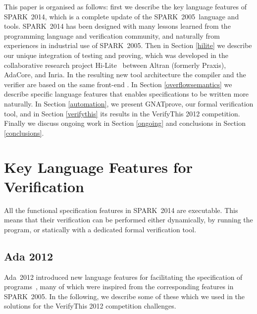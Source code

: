 \documentclass[sttt,final]{svjour}
\newcommand{\hilite}{Hi-Lite}
\newcommand{\oldspark}{SPARK~2005\xspace}
\newcommand{\newspark}{SPARK~2014\xspace}
\newcommand{\adatwtw}{Ada~2012\xspace}
\begin{document}
This paper is organised as follows: first we describe the key language
features of \newspark, which is a complete update of the \oldspark\
language and tools. \newspark has been designed with many lessons
learn\-ed from the programming language and verification community, and
naturally from experiences in industrial use of \oldspark. Then in
Section \ref{hilite} we describe our unique integration of testing and
proving, which was developed in the collaborative research project
\hilite\ \cite{hiliteERTS2012} between Altran (formerly Praxis),
AdaCore, and Inria. In the resulting new tool architecture the
compiler and the verifier are based on the same front-end
\cite{ksd2012}. In Section \ref{overflowsemantics} we describe
specific language features that enables specifications to be written
more naturally. In Section \ref{automation}, we present GNATprove, our
formal verification tool, and in Section \ref{verifythis} its results in
the VerifyThis 2012 competition. Finally we discuss ongoing work in Section
\ref{ongoing} and conclusions in Section \ref{conclusions}.

\section{Key Language Features for Verification}
\label{langfeatures}

All the functional specification features in \newspark are executable. This
means that their verification can be performed either dynamically, by running
the program, or statically with a dedicated formal verification tool.

\subsection{Ada 2012}

\adatwtw introduced new language features for facilitating the
specification of programs~\cite{ada2012rationale}, many of which were
inspired from the corresponding features in \oldspark. In the following,
we describe some of these which we used in the solutions for the
VerifyThis 2012 competition challenges.
\end{document}
